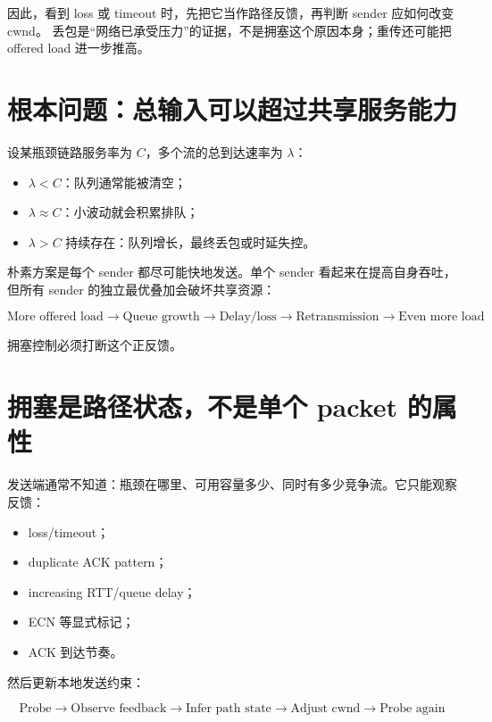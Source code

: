 \documentclass[UTF8,fontset=none,11pt,a4paper]{ctexart}
\providecommand{\tightlist}{\setlength{\itemsep}{0pt}\setlength{\parskip}{0pt}}
\begin{document}
因此，看到 loss 或 timeout 时，先把它当作路径反馈，再判断 sender 应如何改变 cwnd。
丢包是“网络已承受压力”的证据，不是拥塞这个原因本身；重传还可能把 offered load
进一步推高。

\section{根本问题：总输入可以超过共享服务能力}\label{1-ux6839ux672cux95eeux9898ux603bux8f93ux5165ux53efux4ee5ux8d85ux8fc7ux5171ux4eabux670dux52a1ux80fdux529b}

设某瓶颈链路服务率为 \(C\)，多个流的总到达速率为 \(\lambda\)：

\begin{itemize}
\tightlist
\item
  \(\lambda<C\)：队列通常能被清空；
\item
  \(\lambda\approx C\)：小波动就会积累排队；
\item
  \(\lambda>C\) 持续存在：队列增长，最终丢包或时延失控。
\end{itemize}

朴素方案是每个 sender 都尽可能快地发送。单个 sender
看起来在提高自身吞吐，但所有 sender 的独立最优叠加会破坏共享资源：

\[
\boxed{
\text{More offered load}
\to \text{Queue growth}
\to \text{Delay/loss}
\to \text{Retransmission}
\to \text{Even more load}
}
\]

拥塞控制必须打断这个正反馈。

\section{拥塞是路径状态，不是单个 packet
的属性}\label{2-ux62e5ux585eux662fux8defux5f84ux72b6ux6001ux4e0dux662fux5355ux4e2a-packet-ux7684ux5c5eux6027}

发送端通常不知道：瓶颈在哪里、可用容量多少、同时有多少竞争流。它只能观察反馈：

\begin{itemize}
\tightlist
\item
  loss/timeout；
\item
  duplicate ACK pattern；
\item
  increasing RTT/queue delay；
\item
  ECN 等显式标记；
\item
  ACK 到达节奏。
\end{itemize}

然后更新本地发送约束：

\[
\boxed{
\text{Probe}
\to \text{Observe feedback}
\to \text{Infer path state}
\to \text{Adjust cwnd}
\to \text{Probe again}
}
\]
\end{document}
